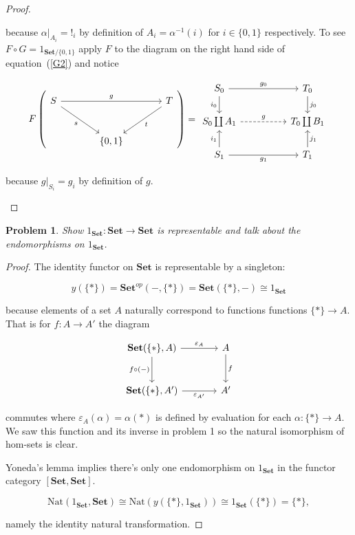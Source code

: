 \documentclass[11pt]{amsart}
\theoremstyle{plain}
\newtheorem{prob}[thm]{Problem}
\theoremstyle{definition}
\newcommand{\vep}{\varepsilon}
\newcommand{\Nat}{\mathrm{Nat}}
\newcommand{\Set}{{\mathbf{Set}}}
\newcommand{\noi}{{\noindent}}
\begin{document}
\begin{proof}
\begin{enumerate}
\noi because $\alpha|_{A_i} = !_i$ by definition of $A_i = \alpha^{-1}(i)$ for $i \in \{0,1\}$ respectively. To see $F \circ G = 1_{\Set/\{0,1\}}$ apply $F$ to the diagram on the right hand side of equation~(\ref{G2}) and notice 


\[ F \left(\begin{tikzcd}[column sep = large, row sep = large]
    S \ar[dr, "s"']\rar[rr,"g"] && T \ar[dl, "t"] \\
    & \{ 0 , 1 \} & 
    \end{tikzcd}\right) = 
    \begin{tikzcd}[column sep = huge]
    S_0 \dar["i_0"'] \rar["g_0"] & T_0 \dar["j_0"]\\ 
    S_0 \coprod A_1 \rar[dashed, "g"]  & T_0 \coprod B_1\\
    S_1 \uar["i_1"] \rar["g_1"'] & T_1 \uar["j_1"'] 
    \end{tikzcd}
    \]

\noi because $g|_{S_i} = g_i$ by definition of $g$. 
\end{enumerate}
\end{proof}

\begin{prob}
Show $1_\Set : \Set \to \Set$ is representable and talk about the endomorphisms on $1_\Set$. 
\end{prob}
\begin{proof}
The identity functor on $\Set$ is representable by a singleton:

\[ y(\{*\}) = \Set^{op}( - , \{*\}) = \Set(\{*\} , - ) \cong 1_\Set\]

\noi because elements of a set $A$ naturally correspond to functions functions $\{*\} \to A$. That is for $f : A \to A'$ the diagram 

\[ \begin{tikzcd}[column sep = large, row sep = large]
\Set(\{*\} , A ) \dar["f \circ (-)"']\rar["\vep_{A}"] & A \dar["f"] \\
\Set(\{*\} , A') \rar["\vep_{A'}"'] & A'
\end{tikzcd}\]

\noi commutes where $\vep_A(\alpha) = \alpha(*)$ is defined by evaluation for each $\alpha : \{*\} \to A$. We saw this function and its inverse in problem 1 so the natural isomorphism of hom-sets is clear. \medskip 

\noi Yoneda's lemma implies there's only one endomorphism on $1_\Set$ in the functor category $[\Set , \Set]$. 

\[ \Nat(1_\Set, \Set) \cong \Nat (y(\{*\} , 1_\Set )) \cong 1_{\Set}(\{*\}) = \{*\},\]

\noi namely the identity natural transformation. 
\end{proof}
\end{document}
